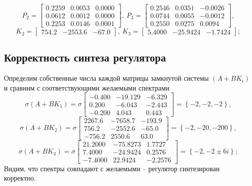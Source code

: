 \documentclass[a4paper, 12pt]{article}
\begin{document}
    $$
    P_2=\begin{bmatrix}
    0.2259    &0.0053    &0.0000\\
    0.0612    &0.0012    &0.0000\\
    0.2253    &0.0146    &0.0001
    \end{bmatrix},\ P_3=\begin{bmatrix}
    0.2546    &0.0351   &-0.0026\\
    0.0744    &0.0055   &-0.0012\\
    0.2550    &0.0275    &0.0094
    \end{bmatrix},
    $$
    $$
    K_2=\begin{bmatrix}
        754.2 &-2553.6 &-67.0
    \end{bmatrix},\ K_3=\begin{bmatrix}
        5.4000  &-25.9424   &-1.7424
    \end{bmatrix};
    $$


    \subsection{Корректность синтеза регулятора}
    Определим собственные числа каждой матрицы замкнутой системы $\left(A+BK_i\right)$ и
    сравним с соответствующими желаемыми спектрами
    $$
    \sigma\left(A+BK_1\right)=\sigma\begin{bmatrix}
    -0.400  &-19.129   &-6.329\\
    0.200   &-6.043   &-2.443\\
   -0.200    &4.043    &0.443
    \end{bmatrix}=\left\{-2,-2,-2\right\},
    $$
    $$
    \sigma\left(A+BK_2\right)=\sigma\begin{bmatrix}
    2267.6   &-7658.7   &-193.9\\
    756.2   &-2552.6   &-65.0\\
   -756.2    &2550.6    &63.0
    \end{bmatrix}=\left\{-2,-20,-200\right\},
    $$
    $$
    \sigma\left(A+BK_3\right)=\sigma\begin{bmatrix}
    21.2000  &-75.8273    &1.7727\\
    7.4000  &-24.9424    &0.2576\\
   -7.4000   &22.9424   &-2.2576
    \end{bmatrix}=\left\{-2,-2\pm6i\right\};
    $$
    Видим, что спектры совпадают с желаемыми -- регулятор синтезирован корректно.
\end{document}
